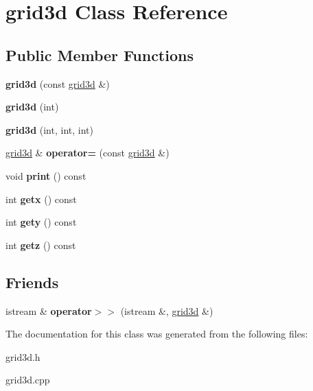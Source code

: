\hypertarget{classgrid3d}{\section{grid3d Class Reference}
\label{classgrid3d}
}
\subsection*{Public Member Functions}
\begin{DoxyCompactItemize}
\item 
\hypertarget{classgrid3d_a2a6918db46d0245fa5a57dc715068d43}{{\bfseries grid3d} (const \hyperlink{classgrid3d}{grid3d} \&)}\label{classgrid3d_a2a6918db46d0245fa5a57dc715068d43}

\item 
\hypertarget{classgrid3d_a8cd64ce0f8ba222c29adf43b98b09bbf}{{\bfseries grid3d} (int)}\label{classgrid3d_a8cd64ce0f8ba222c29adf43b98b09bbf}

\item 
\hypertarget{classgrid3d_a7e304629a3980eba63fa849921cfa4e4}{{\bfseries grid3d} (int, int, int)}\label{classgrid3d_a7e304629a3980eba63fa849921cfa4e4}

\item 
\hypertarget{classgrid3d_a63fcecee82e5f496fcbe4eaf5b4ea1a4}{\hyperlink{classgrid3d}{grid3d} \& {\bfseries operator=} (const \hyperlink{classgrid3d}{grid3d} \&)}\label{classgrid3d_a63fcecee82e5f496fcbe4eaf5b4ea1a4}

\item 
\hypertarget{classgrid3d_a37bbf05d4ca34750c1d6c3a3180847d3}{void {\bfseries print} () const }\label{classgrid3d_a37bbf05d4ca34750c1d6c3a3180847d3}

\item 
\hypertarget{classgrid3d_ab8658a122aed20a6f0d015f1e452fd00}{int {\bfseries getx} () const }\label{classgrid3d_ab8658a122aed20a6f0d015f1e452fd00}

\item 
\hypertarget{classgrid3d_adc9d6c88c073617cb246a57a20a959cb}{int {\bfseries gety} () const }\label{classgrid3d_adc9d6c88c073617cb246a57a20a959cb}

\item 
\hypertarget{classgrid3d_a54f92b74234aea27b60d956397bb74b6}{int {\bfseries getz} () const }\label{classgrid3d_a54f92b74234aea27b60d956397bb74b6}

\end{DoxyCompactItemize}
\subsection*{Friends}
\begin{DoxyCompactItemize}
\item 
\hypertarget{classgrid3d_a4f8205fd0f7add796096585e801b9151}{istream \& {\bfseries operator$>$$>$} (istream \&, \hyperlink{classgrid3d}{grid3d} \&)}\label{classgrid3d_a4f8205fd0f7add796096585e801b9151}

\end{DoxyCompactItemize}


The documentation for this class was generated from the following files\-:\begin{DoxyCompactItemize}
\item 
grid3d.\-h\item 
grid3d.\-cpp\end{DoxyCompactItemize}
